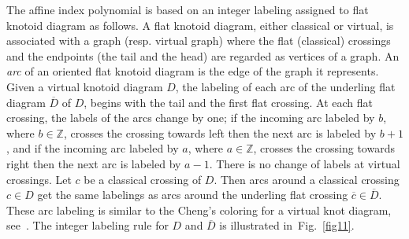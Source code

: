 \documentclass[11pt]{amsart}
\theoremstyle{noparens}
\numberwithin{equation}{section}
\numberwithin{equation}{section}
\begin{document}
The affine index polynomial is based on an integer labeling assigned to flat knotoid diagram as follows. A flat knotoid diagram, either classical or virtual, is associated with a graph (resp. virtual graph) where the flat (classical) crossings and the endpoints (the tail and the head) are regarded as vertices of a graph. An \textit{arc} of an oriented flat knotoid diagram is the edge of the graph it represents. Given a virtual knotoid diagram $D$, the labeling of each arc of the underling flat diagram  $\overline{D}$ of $D$, begins with the tail and the first flat crossing. At each flat crossing, the labels of the arcs change by one; if the incoming arc labeled by $b$, where $b \in \mathbb Z$, crosses the crossing towards left then the next arc is labeled by $b+1$, and if the incoming arc labeled by $a$, where $a \in \mathbb Z$, crosses the crossing towards right then the next arc is labeled by $a-1$. There is no change of labels at virtual crossings. Let $c$ be a classical crossing of $D$. Then arcs around a classical crossing $c \in D$ get the same labelings as arcs around the underling flat crossing $\overline{c} \in \overline{D}$. These arc labeling is similar to the Cheng's coloring for a virtual knot diagram, see~\cite{Che}. The integer labeling rule for $D$ and $\overline{D}$ is illustrated in~Fig.~\ref{fig11}. 
\end{document}
